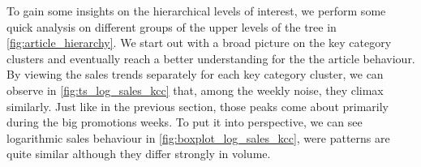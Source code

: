 

To gain some insights on the hierarchical levels of interest, we perform some quick analysis on different groups of the upper levels of the tree in \autoref{fig:article_hierarchy}. We start out with a broad picture on the key category clusters 
and eventually reach a better understanding for the the article behaviour.\\



By viewing the sales trends separately for each key category cluster, we can observe in \autoref{fig:ts_log_sales_kcc} that, among the weekly noise, they climax similarly. Just like in the previous section, those peaks come about primarily during the big promotions weeks. To put it into perspective, we can see logarithmic sales behaviour in \autoref{fig:boxplot_log_sales_kcc}, were patterns are quite similar although they differ strongly in volume. \\

